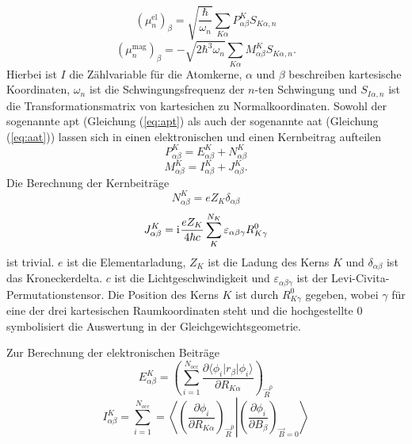 	\begin{equation}
	  (\mu_n^{\text{el}})_\beta=\sqrt{\frac{\hbar}{\omega_n}}\sum_{K\alpha}P_{\alpha\beta}^K S_{K\alpha,n}
	\end{equation}
	\begin{equation}
	  (\mu_n^{\text{mag}})_\beta=-\sqrt{2\hbar^3\omega_n}\sum_{K\alpha}M_{\alpha\beta}^KS_{K\alpha,n}.
	\end{equation}
	Hierbei ist $I$ die Zählvariable für die Atomkerne, $\alpha$ und $\beta$ beschreiben kartesische Koordinaten, $\omega_n$ ist die Schwingungsfrequenz der $n$-ten Schwingung und $S_{I\alpha,n}$ ist die Transformationsmatrix von kartesichen zu Normalkoordinaten. Sowohl der sogenannte \ac{apt} (Gleichung (\ref{eq:apt}) als auch der sogenannte \ac{aat} (Gleichung (\ref{eq:aat})) lassen sich in einen elektronischen und einen Kernbeitrag aufteilen
	\begin{equation}\label{eq:apt}
	  P^K_{\alpha\beta}=E^K_{\alpha\beta}+N^K_{\alpha\beta}
	\end{equation}
	\begin{equation}\label{eq:aat}
   	  M^K_{\alpha\beta}=I^K_{\alpha\beta}+J^K_{\alpha\beta}.
	\end{equation}
	Die Berechnung der Kernbeiträge 
	\begin{equation}
	  N^K_{\alpha\beta}=eZ_K\delta_{\alpha\beta}
	\end{equation}
	\begin{equation}
	  J^K_{\alpha\beta}=\mathrm{i}\mkern1mu\frac{eZ_K}{4\hbar c}\sum_K^{N_K}\varepsilon_{\alpha\beta\gamma}R^0_{K\gamma}
	\end{equation}
	ist trivial. $e$ ist die Elementarladung, $Z_K$ ist die Ladung des Kerns $K$ und $\delta_{\alpha\beta}$ ist das Kroneckerdelta. $c$ ist die Lichtgeschwindigkeit und $\varepsilon_{\alpha\beta\gamma}$ ist der Levi-Civita-Permutationstensor. Die Position des Kerns $K$ ist durch $R^0_{K\gamma}$ gegeben, wobei $\gamma$ für eine der drei kartesischen Raumkoordinaten steht und die hochgestellte $0$ symbolisiert die Auswertung in der Gleichgewichtsgeometrie.   
	
    Zur Berechnung der elektronischen Beiträge 
    \begin{equation}
      E^K_{\alpha\beta}=\left(\sum_{i=1}^{N_{\text{occ}}}\frac{\partial \langle\phi_i\vert r_\beta\vert\phi_i\rangle}{\partial R_{K\alpha}}\right)_{\vec{R}^0}
    \end{equation}
    \begin{equation}\label{eq:vcdaatel}
      I^K_{\alpha\beta}=\sum_{i=1}^{N_{\text{occ}}}=\left\langle\left.\left(\frac{\partial \phi_i}{\partial R_{K\alpha}}\right)_{\vec{R}^0}\right|\left(\frac{\partial \phi_i}{\partial B_\beta}\right)_{\vec{B}=0}\right\rangle
    \end{equation}
    
